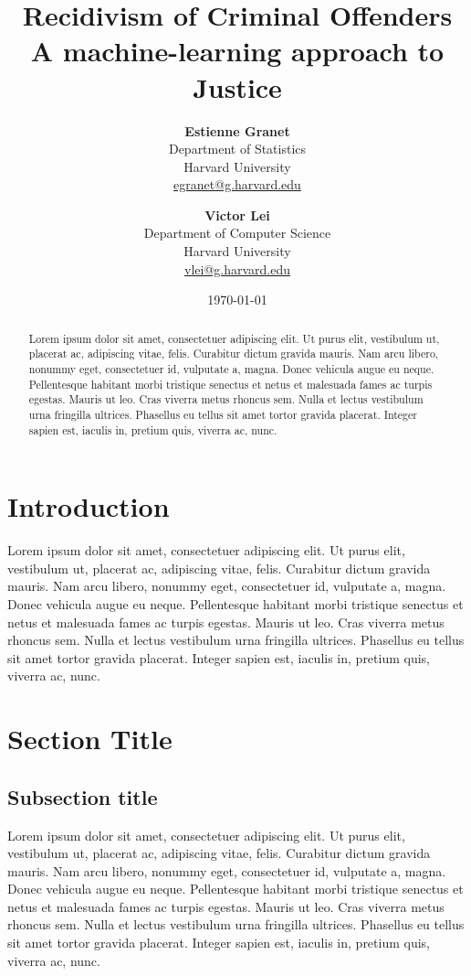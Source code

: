 \documentclass[a4paper]{article}
\title{\Huge Recidivism of Criminal Offenders \newline \LARGE A machine-learning approach to Justice \newline {}}
\author{\textbf{Estienne Granet} \\
  Department of Statistics\\
  Harvard University \\
  \href{mailto:egranet@g.harvard.edu}{egranet@g.harvard.edu}
  \and
  \textbf{Victor Lei} \\
  Department of Computer Science\\
  Harvard University \\
  \href{mailto:vlei@g.harvard.edu}{vlei@g.harvard.edu}}
\date{\today}
\theoremstyle{plain}
\begin{document}
\maketitle

\begin{abstract}
Lorem ipsum dolor sit amet, consectetuer adipiscing elit. Ut purus elit, vestibulum ut, placerat ac, adipiscing vitae, felis. Curabitur dictum gravida mauris. Nam arcu libero, nonummy eget, consectetuer id, vulputate a, magna. Donec vehicula augue eu neque. Pellentesque habitant morbi tristique senectus et netus et malesuada fames ac turpis egestas. Mauris ut leo. Cras viverra metus rhoncus sem. Nulla et lectus vestibulum urna fringilla ultrices. Phasellus eu tellus sit amet tortor gravida placerat. Integer sapien est, iaculis in, pretium quis, viverra ac, nunc.
\end{abstract}

\section*{Introduction}

Lorem ipsum dolor sit amet, consectetuer adipiscing elit. Ut purus elit, vestibulum ut, placerat ac, adipiscing vitae, felis. Curabitur dictum gravida mauris. Nam arcu libero, nonummy eget, consectetuer id, vulputate a, magna. Donec vehicula augue eu neque. Pellentesque habitant morbi tristique senectus et netus et malesuada fames ac turpis egestas. Mauris ut leo. Cras viverra metus rhoncus sem. Nulla et lectus vestibulum urna fringilla ultrices. Phasellus eu tellus sit amet tortor gravida placerat. Integer sapien est, iaculis in, pretium quis, viverra ac, nunc.

\section{Section Title}

\subsection{Subsection title}

Lorem ipsum dolor sit amet, consectetuer adipiscing elit. Ut purus elit, vestibulum ut, placerat ac, adipiscing vitae, felis. Curabitur dictum gravida mauris. Nam arcu libero, nonummy eget, consectetuer id, vulputate a, magna. Donec vehicula augue eu neque. Pellentesque habitant morbi tristique senectus et netus et malesuada fames ac turpis egestas. Mauris ut leo. Cras viverra metus rhoncus sem. Nulla et lectus vestibulum urna fringilla ultrices. Phasellus eu tellus sit amet tortor gravida placerat. Integer sapien est, iaculis in, pretium quis, viverra ac, nunc.
\end{document}
